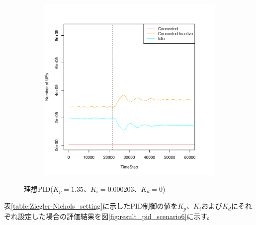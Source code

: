 \documentclass[a4j]{ujarticle}
\begin{document}
\begin{figure}[htbp]
\begin{subfigure}{0.49\hsize}
   \label{subfig:scenario_6_signaling_and_memoryload_vs_timeStep_86400_345600_1-35_0-000203_0_0_ideal}
 \end{subfigure}
 \begin{subfigure}{0.49\hsize}
   \centering
   \includegraphics[width=1.0\hsize]{scenario_6_stateBreakdown_86400_345600_1-35_0-000203_0_0_ideal.pdf}
   \label{subfig:scenario_6_stateBreakdown_86400_345600_1-35_0-000203_0_0_ideal}
 \end{subfigure}
 \caption{理想PID($K_p = 1.35、K_i = 0.000203、K_d = 0$)}
 \label{fig:result_pi_scenario6}
\end{figure}
\clearpage
表\ref{table:Ziegler-Nichols_setting}に示したPID制御の値を$K_p$、$K_i$および$K_d$にそれぞれ設定した場合の評価結果を図\ref{fig:result_pid_scenario6}に示す。
\end{document}
